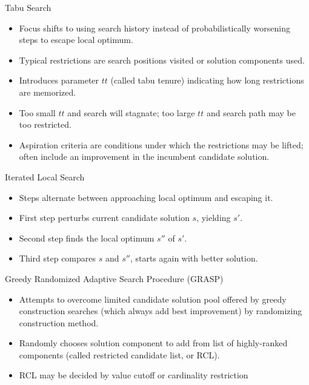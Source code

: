 \documentclass{beamer}
\begin{document}
\begin{frame}{Tabu Search}
\begin{itemize}
    \item Focus shifts to using search history instead of probabilistically worsening steps to escape local optimum.
    \item Typical restrictions are search positions visited or solution components used.
    \item Introduces parameter $tt$ (called tabu tenure) indicating how long restrictions are memorized.
    \item Too small $tt$ and search will stagnate; too large $tt$ and search path may be too restricted.
    \item Aspiration criteria are conditions under which the restrictions may be lifted; often include an improvement in the incumbent candidate solution.
\end{itemize}
\end{frame}

\begin{frame}{Iterated Local Search}
\begin{itemize}
    \item Steps alternate between approaching local optimum and escaping it.
    \item First step perturbs current candidate solution $s$, yielding $s'$.
    \item Second step finds the local optimum $s''$ of $s'$.
    \item Third step compares $s$ and $s''$, starts again with better solution.
\end{itemize}
\end{frame}

\begin{frame}{Greedy Randomized Adaptive Search Procedure (GRASP)}
\begin{itemize}
    \item Attempts to overcome limited candidate solution pool offered by greedy construction searches (which always add best improvement) by randomizing construction method.
    \item Randomly chooses solution component to add from list of highly-ranked components (called restricted candidate list, or RCL).
    \item RCL may be decided by value cutoff or cardinality restriction
\end{itemize}
\end{frame}
\end{document}

